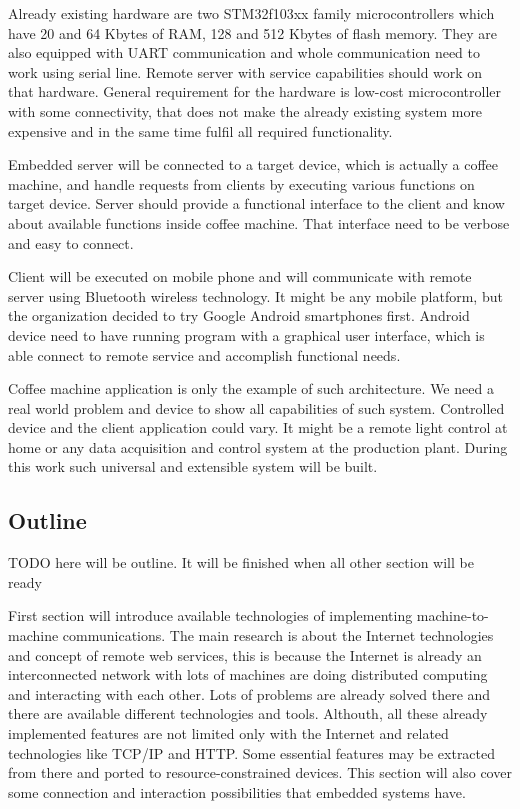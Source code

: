 Already existing hardware are two STM32f103xx family microcontrollers which have
20 and 64 Kbytes of RAM, 128 and 512 Kbytes of flash memory. They are also
equipped with UART communication and whole communication need to work using
serial line. Remote server with service capabilities should work on that
hardware. General requirement for the hardware is low-cost microcontroller with
some connectivity, that does not make the  already existing system more
expensive and in the same time fulfil all required functionality.

Embedded server will be connected to a target device, which is actually a coffee
machine, and handle requests from clients by executing various functions on
target device.
Server should provide a functional interface to the client and know about
available functions inside coffee machine. That interface need to be verbose and
easy to connect. 

Client will be executed on mobile phone and will communicate with remote server
using Bluetooth wireless technology. It might be any mobile platform, but
the organization decided to try Google Android smartphones first. Android device
need to have running program with a graphical user interface, which is able
connect to remote service and accomplish functional needs.

Coffee machine application is only the example of such architecture.
We need a real world problem and device to show all capabilities of such system.
Controlled device and the client application could vary. It might be a
remote light control at home or any data acquisition and control system at the
production plant. During this work such universal and extensible system will be
built.


\subsection{Outline}
TODO here will be outline. It will be finished when all other section will be
ready

First section will introduce available technologies of implementing
machine-to-machine communications. The main research is about the Internet
technologies and concept of remote web services, this is because the Internet
is already an interconnected network with lots of machines are doing distributed
computing and interacting with each other. Lots of problems are already solved
there and there are available different technologies and tools.
Althouth, all these already implemented features are not limited  only with the
Internet and related technologies like TCP/IP and HTTP. Some essential
features may be extracted from there and ported to resource-constrained devices. This section will also cover some connection and
interaction possibilities that embedded systems have.

